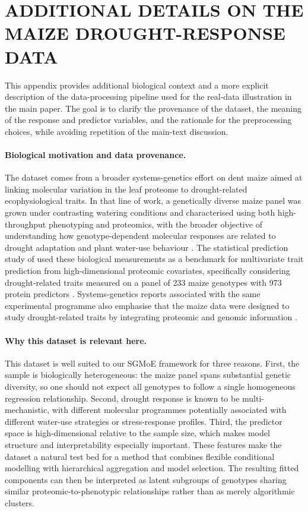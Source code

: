\documentclass[twoside]{article}
\theoremstyle{plain}
\theoremstyle{definition}
\theoremstyle{plain}
\begin{document}
\section{ADDITIONAL DETAILS ON THE MAIZE DROUGHT-RESPONSE DATA}
\label{appendix_real_data_details}

This appendix provides additional biological context and a more explicit description of the data-processing pipeline used for the real-data illustration in the main paper. The goal is to clarify the provenance of the dataset, the meaning of the response and predictor variables, and the rationale for the preprocessing choices, while avoiding repetition of the main-text discussion.

\paragraph{Biological motivation and data provenance.}
The dataset comes from a broader systems-genetics effort on dent maize aimed at linking molecular variation in the leaf proteome to drought-related ecophysiological traits. In that line of work, a genetically diverse maize panel was grown under contrasting watering conditions and characterised using both high-throughput phenotyping and proteomics, with the broader objective of understanding how genotype-dependent molecular responses are related to drought adaptation and plant water-use behaviour \citep{prado2018phenomics,blein2020systems}. The statistical prediction study of \citet{10.1093/jrsssc/qlae012} used these biological measurements as a benchmark for multivariate trait prediction from high-dimensional proteomic covariates, specifically considering drought-related traits measured on a panel of 233 maize genotypes with 973 protein predictors \citep{10.1093/jrsssc/qlae012}. Systems-genetics reports associated with the same experimental programme also emphasise that the maize data were designed to study drought-related traits by integrating proteomic and genomic information \citep{blein2020systems}. 

\paragraph{Why this dataset is relevant here.}
This dataset is well suited to our SGMoE framework for three reasons. First, the sample is biologically heterogeneous: the maize panel spans substantial genetic diversity, so one should not expect all genotypes to follow a single homogeneous regression relationship. Second, drought response is known to be multi-mechanistic, with different molecular programmes potentially associated with different water-use strategies or stress-response profiles. Third, the predictor space is high-dimensional relative to the sample size, which makes model structure and interpretability especially important. These features make the dataset a natural test bed for a method that combines flexible conditional modelling with hierarchical aggregation and model selection. The resulting fitted components can then be interpreted as latent subgroups of genotypes sharing similar proteomic-to-phenotypic relationships rather than as merely algorithmic clusters.
\end{document}
